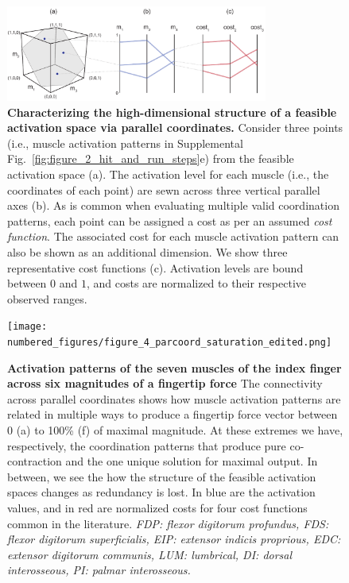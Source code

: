 \documentclass[9pt,twocolumn,twoside,lineno]{pnas-new}
\begin{document}
\begin{figure}[htbp]
 \centering
 \includegraphics[width=8.6cm]{numbered_figures/figure_3_parcoord_schematic.pdf}
 \caption{\textbf{Characterizing the high-dimensional structure of a feasible activation space via parallel coordinates.} Consider three points (i.e., muscle activation patterns in Supplemental Fig.~\ref{fig:figure_2_hit_and_run_steps}e) from the feasible activation space (a). The activation level for each muscle (i.e., the coordinates of each point) are sewn across three vertical parallel axes (b). As is common when evaluating multiple valid coordination patterns, each point can be assigned a cost as per an assumed \emph{cost function}. The associated cost for each muscle activation pattern can also be shown as an additional dimension. We show three representative cost functions (c). Activation levels are bound between $0$ and $1$, and costs are normalized to their respective observed ranges.}
 \label{fig:points_to_parcoords_mapping}
\end{figure}

\begin{figure}[htbp]
 \centering
 \texttt{[image: numbered\_figures/figure\_4\_parcoord\_saturation\_edited.png]}
 \caption{\textbf{Activation patterns of the seven muscles of the index finger across six magnitudes of a fingertip force} The connectivity across parallel coordinates shows how muscle activation patterns are related in multiple ways to produce a fingertip force vector between 0 (a) to 100\% (f) of maximal magnitude. At these extremes we have, respectively, the coordination patterns that produce pure co-contraction and the one unique solution for maximal output. In between, we see the how the structure of the feasible activation spaces changes as redundancy is lost. In blue are the activation values, and in red are normalized costs for four cost functions common in the literature. \textit{FDP: flexor digitorum profundus, FDS: flexor digitorum superficialis, EIP: extensor indicis proprious, EDC: extensor digitorum communis, LUM: lumbrical, DI: dorsal interosseous, PI: palmar interosseous.}}
 \label{fig:figure_4_parcoord}
\end{figure}
\end{document}
